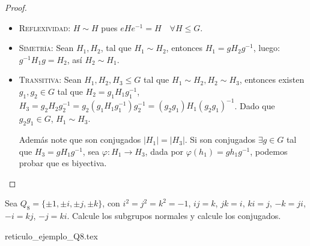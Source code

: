 \begin{proof}
	\begin{itemize}
		\item \textsc{Reflexividad:} $H \sim H$ pues $eHe^{-1} = H \quad \forall H \le G$.

		\item \textsc{Simetría:} Sean $H_1, H_2$, tal que $H_1 \sim H_2$, entonces $H_1 = g H_2 g^{-1}$, luego: $g^{-1}H_1 g = H_2$, así $H_2 \sim H_1$.

		\item \textsc{Transitiva:} Sean $H_1, H_2, H_3 \le G$ tal que $H_1 \sim H_2, H_2 \sim H_3$, entonces existen $g_1, g_2 \in G$ tal que $H_2 = g_1 H_1 g_1^{-1}$, $H_3 = g_2 H_2 g_2^{-1} = g_2 (g_1 H_1 g_1^{-1}) g_2^{-1} = (g_2 g_1) H_1 (g_2 g_1)^{-1}$.
		      Dado que $g_2 g_1 \in G$, $H_1 \sim H_3$.

		      Además note que son conjugados $|H_1| = |H_3|$. Si son conjugados $\exists g \in G$ tal que $H_3 = g H_1 g^{-1}$, sea $\varphi: H_1 \to H_3$, dada por $\varphi(h_1) = g h_1 g^{-1}$, podemos probar que es biyectiva.
	\end{itemize}
\end{proof}

\begin{eje}
	Sea $Q_8 = \{ \pm 1, \pm i, \pm j, \pm k \}$, con $i^2 = j^2 = k^2 = -1$, $ij=k$, $jk=i$, $ki=j$, $-k=ji$, $-i=kj$, $-j=ki$. Calcule los subgrupos normales y calcule los conjugados.
\end{eje}

{reticulo_ejemplo_Q8.tex}


